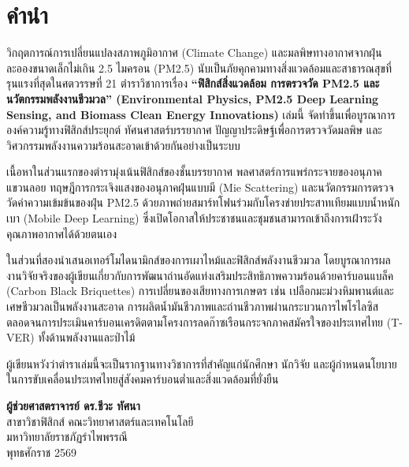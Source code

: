 \chapter*{คำนำ}

วิกฤตการณ์การเปลี่ยนแปลงสภาพภูมิอากาศ (Climate Change) และมลพิษทางอากาศจากฝุ่นละอองขนาดเล็กไม่เกิน 2.5 ไมครอน (PM2.5) นับเป็นภัยคุกคามทางสิ่งแวดล้อมและสาธารณสุขที่รุนแรงที่สุดในศตวรรษที่ 21 ตำราวิชาการเรื่อง \textbf{“ฟิสิกส์สิ่งแวดล้อม การตรวจวัด PM2.5 และนวัตกรรมพลังงานชีวมวล” (Environmental Physics, PM2.5 Deep Learning Sensing, and Biomass Clean Energy Innovations)} เล่มนี้ จัดทำขึ้นเพื่อบูรณาการองค์ความรู้ทางฟิสิกส์ประยุกต์ ทัศนศาสตร์บรรยากาศ ปัญญาประดิษฐ์เพื่อการตรวจวัดมลพิษ และวิศวกรรมพลังงานความร้อนสะอาดเข้าด้วยกันอย่างเป็นระบบ

เนื้อหาในส่วนแรกของตำรามุ่งเน้นฟิสิกส์ของชั้นบรรยากาศ พลศาสตร์การแพร่กระจายของอนุภาคแขวนลอย ทฤษฎีการกระเจิงแสงของอนุภาคฝุ่นแบบมี (Mie Scattering) และนวัตกรรมการตรวจวัดค่าความเข้มข้นของฝุ่น PM2.5 ด้วยภาพถ่ายสมาร์ทโฟนร่วมกับโครงข่ายประสาทเทียมแบบน้ำหนักเบา (Mobile Deep Learning) ซึ่งเปิดโอกาสให้ประชาชนและชุมชนสามารถเข้าถึงการเฝ้าระวังคุณภาพอากาศได้ด้วยตนเอง

ในส่วนที่สองนำเสนอเทอร์โมไดนามิกส์ของการเผาไหม้และฟิสิกส์พลังงานชีวมวล โดยบูรณาการผลงานวิจัยจริงของผู้เขียนเกี่ยวกับการพัฒนาถ่านอัดแท่งเสริมประสิทธิภาพความร้อนด้วยคาร์บอนแบล็ค (Carbon Black Briquettes) การเปลี่ยนของเสียทางการเกษตร เช่น เปลือกมะม่วงหิมพานต์และเศษชีวมวลเป็นพลังงานสะอาด การผลิตน้ำมันชีวภาพและถ่านชีวภาพผ่านกระบวนการไพโรไลซิส ตลอดจนการประเมินคาร์บอนเครดิตตามโครงการลดก๊าซเรือนกระจกภาคสมัครใจของประเทศไทย (T-VER) ทั้งด้านพลังงานและป่าไม้

ผู้เขียนหวังว่าตำราเล่มนี้จะเป็นรากฐานทางวิชาการที่สำคัญแก่นักศึกษา นักวิจัย และผู้กำหนดนโยบายในการขับเคลื่อนประเทศไทยสู่สังคมคาร์บอนต่ำและสิ่งแวดล้อมที่ยั่งยืน

\vspace{1.5cm}
\begin{flushright}
    \textbf{ผู้ช่วยศาสตราจารย์ ดร.ชีวะ ทัศนา}\\[0.2cm]
    สาขาวิชาฟิสิกส์ คณะวิทยาศาสตร์และเทคโนโลยี\\[0.1cm]
    มหาวิทยาลัยราชภัฏรำไพพรรณี\\[0.1cm]
    พุทธศักราช 2569
\end{flushright}
